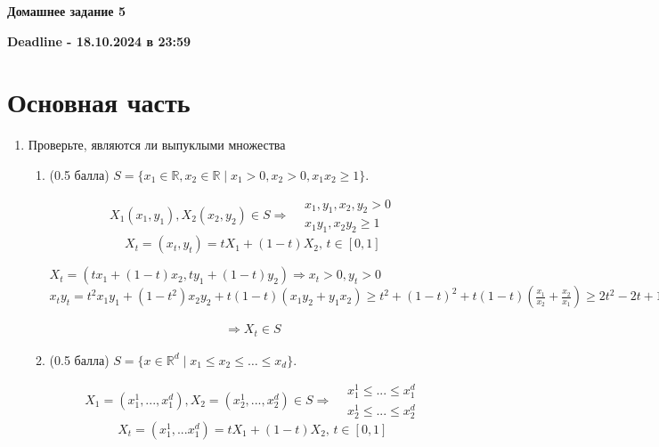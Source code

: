 \documentclass[a5paper,twoside,russian]{article}
\begin{document}
\begin{center}
    \textbf{Домашнее задание 5}
\end{center}
\begin{center}
    \textbf{Deadline - 18.10.2024 в 23:59}
\end{center}

\section*{Основная часть}
\begin{enumerate}[label=\textbf{Задача \arabic*.}]
\subsection*{Выпуклые множества}
\item Проверьте, являются ли выпуклыми множества 
    \begin{enumerate}
        \item (0.5 балла) $S = \{ x_1 \in \mathbb{R}, x_2 \in \mathbb{R} \mid x_1 > 0, x_2 > 0, x_1 x_2 \geq 1 \}$.      

        \begin{prf}
            \[       
            X_1(x_1, y_1), X_2(x_2, y_2) \in S\Rightarrow     
            \begin{aligned}
                &x_1, y_1, x_2, y_2 > 0 \\
                &x_1 y_1, x_2 y_2 \geq 1
            \end{aligned}
            \]
            \[
            X_t = (x_t, y_t) = tX_1 + (1-t)X_2, \, t \in [0, 1]
            \]

            $X_t = \left( tx_1 + (1-t)x_2, ty_1 + (1-t)y_2 \right) \Rightarrow x_t > 0, y_t > 0$
            $x_t y_t = t^2 x_1 y_1 + (1-t^2) x_2 y_2 + t (1-t)(x_1 y_2 + y_1 x_2) \geq t^2 + (1-t)^2 + t(1-t)\left(\frac{x_1}{x_2} + \frac{x_2}{x_1}\right) \geq 2t^2 - 2t + 1 + t(1-t) \cdot 2 = 1$
        
            \[
            \begin{aligned}
                \Rightarrow X_t \in S
            \end{aligned}
            \]
        \end{prf}

        \item (0.5 балла) $S = \{ x \in \mathbb{R}^d \mid x_1 \leq x_2 \leq \ldots \leq x_d \}$.
        
        \begin{prf}
            \[
            X_1 = (x_1^1, ..., x_1^d), X_2 = (x_2^1, ..., x_2^d) \in S \Rightarrow
            \begin{aligned}
                &x_1^1 \leq ... \leq x_1^d \\
                &x_2^1 \leq ... \leq x_2^d
            \end{aligned}
            \]
            \[
            X_t = (x_1^1, ... x_1^d) = tX_1 + (1-t)X_2, \, t \in [0, 1]
            \]


\end{prf}
\end{enumerate}
\end{enumerate}
\end{document}
